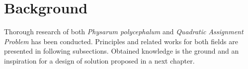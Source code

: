 \chapter{Background}
\label{chapter:background}

Thorough research of both \textit{Physarum polycephalum} and \textit{Quadratic Assignment Problem} has been conducted. Principles and related works for both fields are presented in following subsections. Obtained knowledge is the ground and an inspiration for a design of solution proposed in a next chapter.





